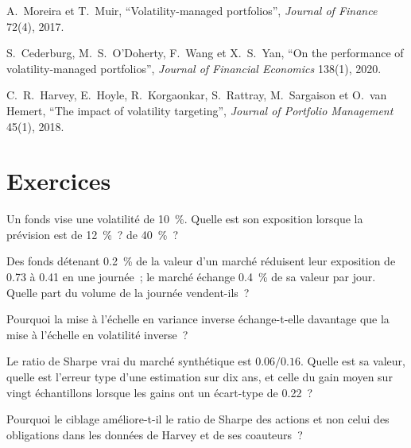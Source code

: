 \begin{omsources}
\item A.~Moreira et T.~Muir, ``Volatility-managed portfolios'', \emph{Journal of Finance} 72(4), 2017.
\item S.~Cederburg, M.~S.~O'Doherty, F.~Wang et X.~S.~Yan, ``On the performance of volatility-managed portfolios'', \emph{Journal of Financial
Economics} 138(1), 2020.
\item C.~R.~Harvey, E.~Hoyle, R.~Korgaonkar, S.~Rattray, M.~Sargaison et O.~van Hemert, ``The impact of volatility targeting'', \emph{Journal of
Portfolio Management} 45(1), 2018.
\end{omsources}

\section{Exercices}

\begin{exercise}[$\star$]\label{exo:s1:volatility-targeting-and-risk-managed-portfolios:1}
Un fonds vise une volatilité de 10~\%. Quelle est son exposition lorsque la prévision est de 12~\%~? de 40~\%~?
\end{exercise}

\begin{exercise}[$\star$]\label{exo:s1:volatility-targeting-and-risk-managed-portfolios:2}
Des fonds détenant 0.2~\% de la valeur d'un marché réduisent leur exposition de 0.73 à 0.41 en une journée~; le marché échange 0.4~\% de sa valeur par jour. Quelle part du
volume de la journée vendent-ils~?
\end{exercise}

\begin{exercise}[$\star$]\label{exo:s1:volatility-targeting-and-risk-managed-portfolios:3}
Pourquoi la mise à l'échelle en variance inverse échange-t-elle davantage que la mise à l'échelle en volatilité inverse~?
\end{exercise}

\begin{exercise}[$\star\star$]\label{exo:s1:volatility-targeting-and-risk-managed-portfolios:4}
Le ratio de Sharpe vrai du marché synthétique est $0.06/0.16$. Quelle est sa valeur, quelle est l'erreur type d'une estimation sur dix ans, et celle du gain moyen sur
vingt échantillons lorsque les gains ont un écart-type de 0.22~?
\end{exercise}

\begin{exercise}[$\star\star$]\label{exo:s1:volatility-targeting-and-risk-managed-portfolios:5}
Pourquoi le ciblage améliore-t-il le ratio de Sharpe des actions et non celui des obligations dans les données de Harvey et de ses coauteurs~?
\end{exercise}

